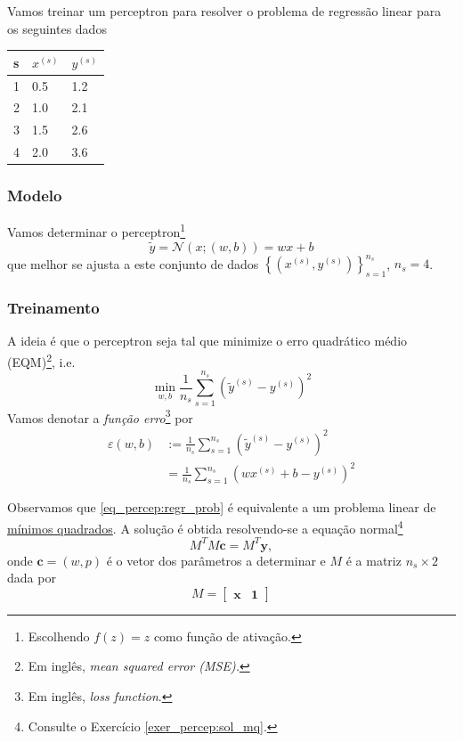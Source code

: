 Vamos treinar um perceptron para resolver o problema de regressão linear para os seguintes dados

\begin{center}
  \begin{tabular}{l|ll}
    s & $x^{(s)}$ & $y^{(s)}$\\\hline
    1 & 0.5 & 1.2\\
    2 & 1.0 & 2.1\\
    3 & 1.5 & 2.6\\
    4 & 2.0 & 3.6\\\hline
  \end{tabular}
\end{center}

\subsubsection{Modelo}

Vamos determinar o perceptron\footnote{Escolhendo $f(z)=z$ como função de ativação.}
\begin{equation}\label{eq:percep_regr}
  \tilde{y} = \mathcal{N}(x; (w, b)) = wx + b
\end{equation}
que melhor se ajusta a este conjunto de dados $\left\{(x^{(s)}, y^{(s)})\right\}_{s=1}^{n_s}$, $n_s=4$.

\subsubsection{Treinamento}

A ideia é que o perceptron seja tal que minimize o erro quadrático médio (EQM)\footnote{Em inglês, \it{mean squared error} (MSE).}, i.e.
\begin{equation}\label{eq_percep:regr_prob}
  \min_{w,b}\frac{1}{n_s}\sum_{s=1}^{n_s}\left(\tilde{y}^{(s)}-y^{(s)}\right)^2
\end{equation}
Vamos denotar a \emph{função erro}\footnote{Em inglês, {\it loss function}.} por
\begin{align}\label{eq:eqm}
  \varepsilon(w,b) &:= \frac{1}{n_s}\sum_{s=1}^{n_s}\left(\tilde{y}^{(s)}-y^{(s)}\right)^2\\
                   &= \frac{1}{n_s}\sum_{s=1}^{n_s}\left(wx^{(s)}+b-y^{(s)}\right)^2
\end{align}

Observamos que \eqref{eq_percep:regr_prob} é equivalente a um problema linear de \href{https://notaspedrok.com.br/notas/MatematicaNumerica/cap_ajuste_sec_prob_lin.html}{mínimos quadrados}. A solução é obtida resolvendo-se a equação normal\footnote{Consulte o Exercício \ref{exer_percep:sol_mq}.}
\begin{equation}\label{eq_percep:sol_mq}
  M^TM\pmb{c} = M^T\pmb{y},
\end{equation}
onde $\pmb{c} = (w, p)$ é o vetor dos parâmetros a determinar e $M$ é a matriz $n_s\times 2$ dada por
\begin{equation}
  M =
  \begin{bmatrix}
    \pmb{x} & \pmb{1}
  \end{bmatrix}
\end{equation}


